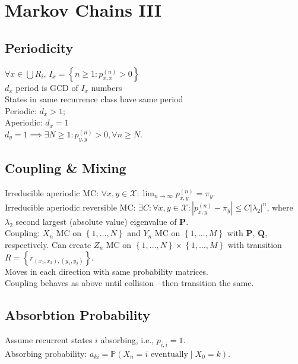 \section{Markov Chains III}
	\subsection*{Periodicity}
	$\forall x\in\bigcup R_{i}$, $I_{x} = \left\{n\geq 1: p_{x,x}^{(n)} > 0\right\}$\\
	$d_{x}$ period is GCD of $I_{x}$ numbers\\
	States in same recurrence class have same period\\
	Periodic: $d_{x} > 1$;\\
	Aperiodic: $d_{x} = 1$\\
	$d_{y} = 1\implies\exists N\geq 1: p_{y,y}^{(n)} > 0, \forall n\geq N$.
	
	\subsection*{Coupling \& Mixing}
	Irreducible aperiodic MC: $\forall x, y\in\mathcal{X}: \lim_{n\to\infty}p_{x,y}^{(n)} = \pi_{y}$.\\
	Irreducible aperiodic reversible MC: $\exists C: \forall x, y\in\mathcal{X}: \left|p_{x,y}^{(n)} - \pi_{y}\right|\leq C\left|\lambda_{2}\right|^{n}$, where $\lambda_{2}$ second largest (absolute value) eigenvalue of $\mathbf{P}$.\\
	Coupling: $X_{n}$ MC on $\left\{1, \dots, N\right\}$ and $Y_{n}$ MC on $\left\{1, \dots, M\right\}$ with $\mathbf{P}$, $\mathbf{Q}$, respectively. Can create $Z_{n}$ MC on $\left\{1, \dots, N\right\}\times\left\{1, \dots, M\right\}$ with transition $R = \left\{r_{\left(x_{1},x_{2}\right),\left(y_{1}, y_{2}\right)}\right\}$.\\
	Moves in each direction with same probability matrices.\\
	Coupling behaves as above until collision---then transition the same.
	
	\subsection*{Absorbtion Probability}
	Assume recurrent states $i$ absorbing, i.e., $p_{i,i} = 1$.\\
	Absorbing probability: $a_{ki} = \mathbb{P}\left(X_{n} = i\text{ eventually}\mid X_{0} = k\right)$.
